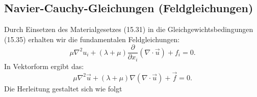 \subsection{Navier-Cauchy-Gleichungen (Feldgleichungen)}
Durch Einsetzen des Materialgesetzes (15.31) in die Gleichgewichtsbedingungen (15.35) erhalten wir die fundamentalen Feldgleichungen:
\begin{equation}
	\mu \nabla^2 u_i + (\lambda + \mu) \frac{\partial}{\partial x_i} (\nabla \cdot \vec{u}) + f_i =
	0.
\end{equation}
In Vektorform ergibt das:
\begin{equation}
	\mu \nabla^2 \vec{u} + (\lambda + \mu) \nabla (\nabla \cdot \vec{u}) + \vec{f} = 
	0.
\end{equation}
Die Herleitung gestaltet sich wie folgt

